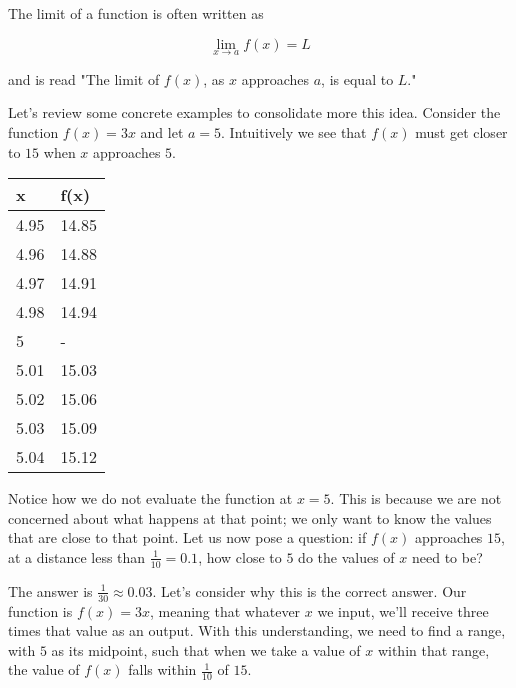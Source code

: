 \documentclass{report}
\begin{document}
The limit of a function is often written as

$$\lim_{x \to a} f(x) = L$$

and is read "The limit of $f(x)$, as $x$ approaches $a$, is equal to $L$."

Let's review some concrete examples to consolidate more this idea. Consider the function $f(x) = 3x$ and let $a = 5$. Intuitively we see that $f(x)$ must get closer to $15$ when $x$ approaches $5$.

\begin{table}[h]
    \begin{center}
        \begin{tabular}{|l|l|}
        \hline
        x    & f(x)  \\ \hline
        4.95 & 14.85 \\
        4.96 & 14.88 \\
        4.97 & 14.91 \\
        4.98 & 14.94 \\
        5    & -     \\
        5.01 & 15.03 \\
        5.02 & 15.06 \\
        5.03 & 15.09 \\
        5.04 & 15.12 \\ \hline
        \end{tabular}
    \end{center}
\end{table}

Notice how we do not evaluate the function at $x=5$. This is because we are not concerned about what happens at that point; we only want to know the values that are close to that point. Let us now pose a question: if $f(x)$ approaches $15$, at a distance less than $\frac{1}{10} = 0.1$, how close to $5$ do the values of $x$ need to be?

The answer is $\frac{1}{30} \approx 0.03$. Let's consider why this is the correct answer. Our function is $f(x) = 3x$, meaning that whatever $x$ we input, we'll receive three times that value as an output. With this understanding, we need to find a range, with $5$ as its midpoint, such that when we take a value of $x$ within that range, the value of $f(x)$ falls within $\frac{1}{10}$ of $15$.
\end{document}
